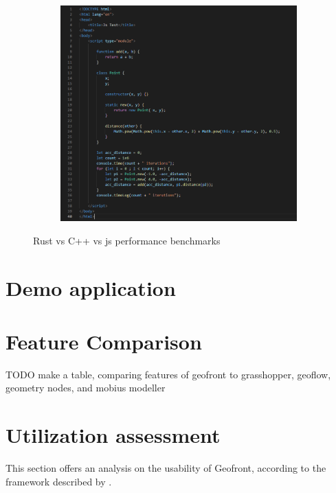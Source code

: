 \begin{figure}
\begin{subfigure}[b]{0.32\linewidth}
    \centering
    \includegraphics[width=\linewidth]{js.PNG}
    \caption{}
  \end{subfigure}%
  \caption[benchmark]{Rust vs C++ vs js performance benchmarks}
  \label{fig:perf-benchmark}
\end{figure}


\section{Demo application}
\label{sec:testing:demo}


\section{Feature Comparison}
\label{sec:testing:features}

TODO make a table, comparing features of geofront to grasshopper, geoflow, geometry nodes, and mobius modeller

\section{Utilization assessment}
\label{sec:testing:usability}


This section offers an analysis on the usability of Geofront, according to the framework described by \cite[]{green_usability_1996}.

